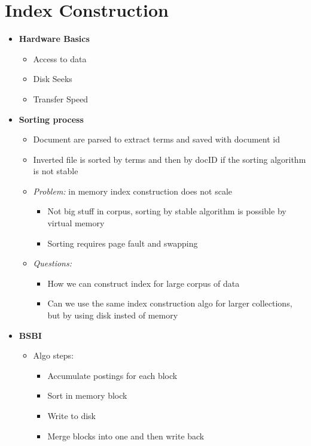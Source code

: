 \chapter{Index Construction}
\begin{itemize}
    \item \textbf{Hardware Basics}
    \begin{itemize}
        \item Access to data
        \item Disk Seeks
        \item Transfer Speed
    \end{itemize}
    \item \textbf{Sorting process}
    \begin{itemize}
        \item Document are parsed to extract terms and saved with document id
        \item Inverted file is sorted by terms and then by docID if the sorting algorithm is not stable
        \item \textit{Problem:} in memory index construction does not scale
        \begin{itemize}
            \item Not big stuff in corpus, sorting by stable algorithm is possible by virtual memory
            \item Sorting requires page fault and swapping
        \end{itemize}
        \item \textit{Questions:}
        \begin{itemize}
            \item How we can construct index for large corpus of data
            \item Can we use the same index construction algo for larger collections, but by using disk insted of memory
        \end{itemize}
    \end{itemize}
    \item \textbf{BSBI}
    \begin{itemize}
        \item Algo steps:
        \begin{itemize}
            \item Accumulate postings for each block
            \item Sort in memory block
            \item Write to disk
            \item Merge blocks into one and then write back

\end{itemize}
\end{itemize}
\end{itemize}
